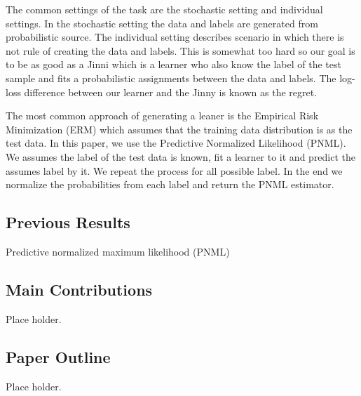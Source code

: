 \documentclass[final,1p,times]{elsarticle}
\begin{document}
The common settings of the task are the stochastic setting and individual settings. In the stochastic setting the data and labels are generated from probabilistic source. The individual setting describes scenario in which there is not rule of creating the data and labels. This is somewhat too hard so our goal is to be as good as a Jinni which is a learner who also know the label of the test sample and fits a probabilistic assignments between the data and labels. The log-loss difference between our learner and the Jinny is known as the regret. 

The most common approach of generating a leaner is the Empirical Risk Minimization (ERM) which assumes that the training data distribution is as the test data. In this paper, we use the Predictive Normalized Likelihood (PNML). We assumes the label of the test data is known, fit a learner to it and predict the assumes label by it. We repeat the process for all possible label. In the end we normalize the probabilities from each label and return the PNML estimator.





\subsection{Previous Results}
Predictive normalized maximum likelihood (PNML)

\subsection{Main Contributions}
Place holder.

\subsection{Paper Outline}
Place holder.

\pagebreak
\end{document}
